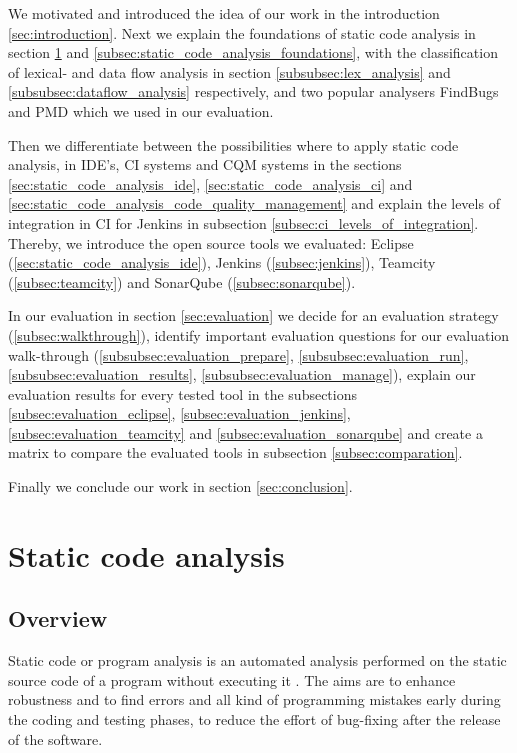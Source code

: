 \documentclass[conference]{IEEEtran}
\begin{document}
We motivated and introduced the idea of our work in the introduction \ref{sec:introduction}.
Next we explain the foundations of static code analysis in section \ref{sec:static_code_analysis} and \ref{subsec:static_code_analysis_foundations}, with the classification of lexical- and data flow analysis in section \ref{subsubsec:lex_analysis} and \ref{subsubsec:dataflow_analysis} respectively, and two popular analysers FindBugs and PMD which we used in our evaluation.

Then we differentiate between the possibilities where to apply static code analysis, in IDE's, CI systems and CQM systems in the sections \ref{sec:static_code_analysis_ide}, \ref{sec:static_code_analysis_ci} and \ref{sec:static_code_analysis_code_quality_management} and explain the levels of integration in CI for Jenkins in subsection \ref{subsec:ci_levels_of_integration}.
Thereby, we introduce the open source tools we evaluated: Eclipse (\ref{sec:static_code_analysis_ide}), Jenkins (\ref{subsec:jenkins}), Teamcity (\ref{subsec:teamcity}) and SonarQube (\ref{subsec:sonarqube}).

In our evaluation in section \ref{sec:evaluation} we decide for an evaluation strategy (\ref{subsec:walkthrough}), identify important evaluation questions for our evaluation walk-through (\ref{subsubsec:evaluation_prepare}, \ref{subsubsec:evaluation_run}, \ref{subsubsec:evaluation_results}, \ref{subsubsec:evaluation_manage}), explain our evaluation results for every tested tool in the subsections \ref{subsec:evaluation_eclipse}, \ref{subsec:evaluation_jenkins}, \ref{subsec:evaluation_teamcity} and \ref{subsec:evaluation_sonarqube} and create a matrix to compare the evaluated tools in subsection \ref{subsec:comparation}.


Finally we conclude our work in section \ref{sec:conclusion}.

\section{Static code analysis}
\label{sec:static_code_analysis}
\subsection{Overview}
\label{subsec:static_code_analysis_overview}
Static code or program analysis is an automated analysis performed on the static source code of a program without executing it \cite{Static_Code_Analysis_def}.
The aims are to enhance robustness and to find errors and all kind of programming mistakes early during the coding and testing phases, to reduce the effort of bug-fixing after the release of the software.
\end{document}
